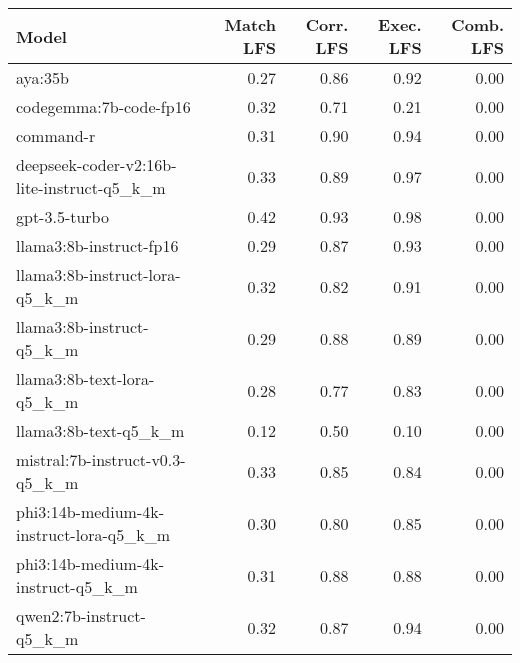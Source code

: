 \begin{tabular}{lrrrr}
\toprule
Model & Match LFS & Corr. LFS & Exec. LFS & Comb. LFS \\
\midrule
aya:35b & 0.27 & 0.86 & 0.92 & 0.00 \\
codegemma:7b-code-fp16 & 0.32 & 0.71 & 0.21 & 0.00 \\
command-r & 0.31 & 0.90 & 0.94 & 0.00 \\
deepseek-coder-v2:16b-lite-instruct-q5\_k\_m & 0.33 & 0.89 & 0.97 & 0.00 \\
gpt-3.5-turbo & 0.42 & 0.93 & 0.98 & 0.00 \\
llama3:8b-instruct-fp16 & 0.29 & 0.87 & 0.93 & 0.00 \\
llama3:8b-instruct-lora-q5\_k\_m & 0.32 & 0.82 & 0.91 & 0.00 \\
llama3:8b-instruct-q5\_k\_m & 0.29 & 0.88 & 0.89 & 0.00 \\
llama3:8b-text-lora-q5\_k\_m & 0.28 & 0.77 & 0.83 & 0.00 \\
llama3:8b-text-q5\_k\_m & 0.12 & 0.50 & 0.10 & 0.00 \\
mistral:7b-instruct-v0.3-q5\_k\_m & 0.33 & 0.85 & 0.84 & 0.00 \\
phi3:14b-medium-4k-instruct-lora-q5\_k\_m & 0.30 & 0.80 & 0.85 & 0.00 \\
phi3:14b-medium-4k-instruct-q5\_k\_m & 0.31 & 0.88 & 0.88 & 0.00 \\
qwen2:7b-instruct-q5\_k\_m & 0.32 & 0.87 & 0.94 & 0.00 \\
\bottomrule
\end{tabular}
